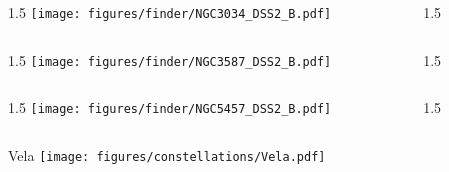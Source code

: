 \documentclass[final]{beamer}
\newlength{\colwidth}
\begin{document}

\begin{frame}[t]{}
  \begin{columns}[T]
    \begin{column}{1.5\colwidth}
      \centering
      \texttt{[image: figures/finder/NGC3034\_DSS2\_B.pdf]}
    \end{column}
    \begin{column}{1.5\colwidth}
      \Large
      
    \end{column}
  \end{columns}
  \vspace{\fill}
  \begin{columns}[T]
    \begin{column}{1.5\colwidth}
      \centering
      \texttt{[image: figures/finder/NGC3587\_DSS2\_B.pdf]}
    \end{column}
    \begin{column}{1.5\colwidth}
      \Large
      
    \end{column}
  \end{columns}
\end{frame}


\begin{frame}[t]{}
  \begin{columns}[T]
    \begin{column}{1.5\colwidth}
      \centering
      \texttt{[image: figures/finder/NGC5457\_DSS2\_B.pdf]}
    \end{column}
    \begin{column}{1.5\colwidth}
      \Large
      
    \end{column}
  \end{columns}
  \vspace{\fill}
\end{frame}


\begin{frame}[t]{\LARGE Vela}
  \centering
  \texttt{[image: figures/constellations/Vela.pdf]}
\end{frame}
\end{document}
